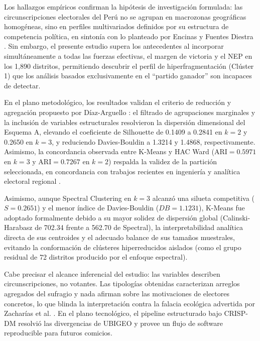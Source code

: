\documentclass[conference,10pt,letterpaper]{IEEEtran}
\begin{document}
Los hallazgos empíricos confirman la hipótesis de investigación formulada: las circunscripciones electorales del Perú no se agrupan en macrozonas geográficas homogéneas, sino en perfiles multivariados definidos por su estructura de competencia política, en sintonía con lo planteado por Encinas y Fuentes Diestra \cite{encinas2021}. Sin embargo, el presente estudio supera los antecedentes al incorporar simultáneamente a todas las fuerzas efectivas, el margen de victoria y el NEP en los 1,890 distritos, permitiendo descubrir el perfil de hiperfragmentación (Clúster 1) que los análisis basados exclusivamente en el ``partido ganador'' son incapaces de detectar.

En el plano metodológico, los resultados validan el criterio de reducción y agregación propuesto por Díaz-Arguello \cite{diaz2025}: el filtrado de agrupaciones marginales y la inclusión de variables estructurales resolvieron la dispersión dimensional del Esquema A, elevando el coeficiente de Silhouette de 0.1409 a 0.2841 en $k = 2$ y 0.2650 en $k = 3$, y reduciendo Davies-Bouldin a 1.3214 y 1.4868, respectivamente. Asimismo, la concordancia observada entre K-Means y HAC Ward ($\mathrm{ARI} = 0.5971$ en $k = 3$ y $\mathrm{ARI} = 0.7267$ en $k = 2$) respalda la validez de la partición seleccionada, en concordancia con trabajos recientes en ingeniería y analítica electoral regional \cite{rebolledo2025, jacintho2021}.

Asimismo, aunque Spectral Clustering en $k = 3$ alcanzó una silueta competitiva ($S = 0.2651$) y el menor índice de Davies-Bouldin ($DB = 1.1231$), K-Means fue adoptado formalmente debido a su mayor solidez de dispersión global (Calinski-Harabasz de 702.34 frente a 562.70 de Spectral), la interpretabilidad analítica directa de sus centroides y el adecuado balance de sus tamaños muestrales, evitando la conformación de clústeres hiperreducidos aislados (como el grupo residual de 72 distritos producido por el enfoque espectral).

Cabe precisar el alcance inferencial del estudio: las variables describen circunscripciones, no votantes. Las tipologías obtenidas caracterizan arreglos agregados del sufragio y nada afirman sobre las motivaciones de electores concretos, lo que blinda la interpretación contra la falacia ecológica advertida por Zacharías et al. \cite{zacharias2015}. En el plano tecnológico, el pipeline estructurado bajo CRISP-DM resolvió las divergencias de UBIGEO y provee un flujo de software reproducible para futuros comicios.
\end{document}
